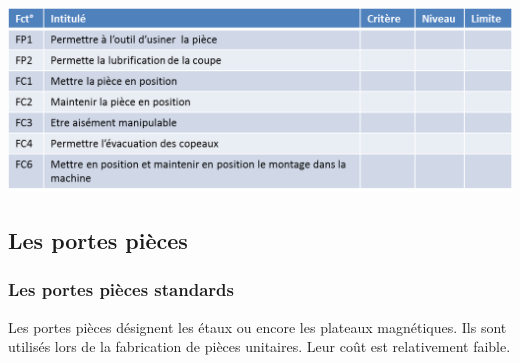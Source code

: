 \documentclass[11pt,oneside]{article}
\begin{document}
\begin{center}
\includegraphics[width=.95\textwidth]{png/af2}
\end{center}


\subsection{Les portes pièces}
\subsubsection{Les portes pièces standards}
Les portes pièces désignent les étaux ou encore les plateaux magnétiques. Ils sont utilisés lors de la fabrication de pièces unitaires. Leur coût est relativement faible. 
\end{document}
